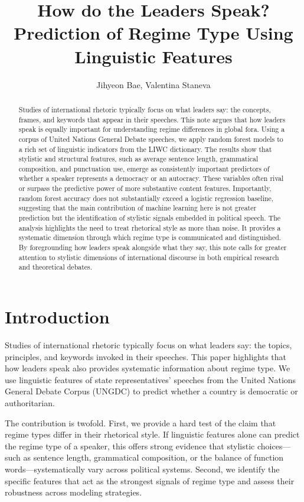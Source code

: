 \documentclass[12pt]{article}
\title{How do the Leaders Speak? Prediction of Regime Type Using Linguistic Features}
\author{Jihyeon Bae, Valentina Staneva}
\date{}
\begin{document}
\maketitle

\begin{abstract}
Studies of international rhetoric typically focus on what leaders say: the concepts, frames, and keywords that appear in their speeches. This note argues that how leaders speak is equally important for understanding regime differences in global fora. Using a corpus of United Nations General Debate speeches, we apply random forest models to a rich set of linguistic indicators from the LIWC dictionary. The results show that stylistic and structural features, such as average sentence length, grammatical composition, and punctuation use, emerge as consistently important predictors of whether a speaker represents a democracy or an autocracy. These variables often rival or surpass the predictive power of more substantive content features. Importantly, random forest accuracy does not substantially exceed a logistic regression baseline, suggesting that the main contribution of machine learning here is not greater prediction but the identification of stylistic signals embedded in political speech. The analysis highlights the need to treat rhetorical style as more than noise. It provides a systematic dimension through which regime type is communicated and distinguished. By foregrounding how leaders speak alongside what they say, this note calls for greater attention to stylistic dimensions of international discourse in both empirical research and theoretical debates.
\end{abstract}


\section{Introduction}

Studies of international rhetoric typically focus on what leaders say: the topics, principles, and keywords invoked in their speeches. This paper highlights that how leaders speak also provides systematic information about regime type. We use linguistic features of state representatives’ speeches from the United Nations General Debate Corpus (UNGDC) to predict whether a country is democratic or authoritarian. 

The contribution is twofold. First, we provide a hard test of the claim that regime types differ in their rhetorical style. If linguistic features alone can predict the regime type of a speaker, this offers strong evidence that stylistic choices—such as sentence length, grammatical composition, or the balance of function words—systematically vary across political systems. Second, we identify the specific features that act as the strongest signals of regime type and assess their robustness across modeling strategies. 
\end{document}
